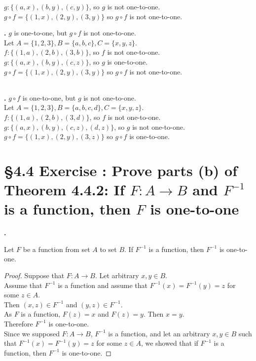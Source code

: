 \documentclass[a4paper,11pt]{article}
\begin{document}
\(g:\{{(a,x)},{(b,y)},{(c,y)}\}\), so \(g\) is not one-to-one.\\
\(g \circ f = \{{(1,x)},{(2,y)},{(3,y)}\}\) so \(g \circ f\) is not one-to-one.
\newpage
\addtocounter{SubsectionCounter}{1}
\noindent\textbf{.} \(g\) is 
one-to-one, but \(g \circ f\) is not one-to-one.\\
Let \(A = \{1,2,3\}, B=\{a,b,c\}, C=\{x,y,z\}\).\\
\(f:\{{(1,a)},{(2,b)},{(3,b)}\}\), so \(f\) is not one-to-one.\\
\(g:\{{(a,x)},{(b,y)},{(c,z)}\}\), so \(g\) is one-to-one.\\
\(g \circ f = \{{(1,x)},{(2,y)},{(3,y)}\}\) so \(g \circ f\) is not 
one-to-one.\\
\\\addtocounter{SubsectionCounter}{1}
\noindent\textbf{.} \(g \circ f\) is 
one-to-one, but \(g\) is not one-to-one.\\
Let \(A = \{1,2,3\}, B=\{a,b,c,d\}, C=\{x,y,z\}\).\\
\(f:\{{(1,a)},{(2,b)},{(3,d)}\}\), so \(f\) is not one-to-one.\\
\(g:\{{(a,x)},{(b,y)},{(c,z)},{(d,z)}\}\), so \(g\) is not one-to-one.\\
\(g \circ f = \{{(1,x)},{(2,y)},{(3,z)}\}\) so \(g \circ f\) is one-to-one.
\newpage
\setcounter{ProblemCounter}{4}
\section*{\S 4.4 Exercise : Prove parts {(b)} of Theorem 4.4.2: If \(F:A \rightarrow B\) and \(F^{-1}\) is a function, then \(F\) is one-to-one}
\setcounter{SubsectionCounter}{1}
\textbf{.}
\begin{theorem1}
  Let \(F\) be a function from set \(A\) to set \(B\). If \(F^{-1}\) is a 
  function, then \(F^{-1}\) is one-to-one.
  \begin{proof}
Suppose that \(F: A \rightarrow B\). Let arbitrary \(x,y \in B\).\\
Assume that \(F^{-1}\) is a function and assume that \(F^{-1}{(x)} = F^{-1}{(y)} = z\) for some \(z \in 
A\).\\
Then \({(x,z)} \in F^{-1}\) and \((y,z) \in F^{-1}\).\\
As \(F\) is a function, \(F{(z)}=x\) and \(F{(z)}=y\). Then \(x = y\).\\
Therefore \(F^{-1}\) is one-to-one.\\
Since we supposed \(F:A \rightarrow B\), \(F^{-1}\) is a function, and let an arbitrary \(x,y \in B\) such that \(F^{-1}{(x)} = F^{-1}{(y)} = z\) for some \(z \in 
A\), we showed that if \(F^{-1}\) is a function, then \(F^{-1}\) is one-to-one.
  \end{proof}
\end{theorem1}
\end{document}
